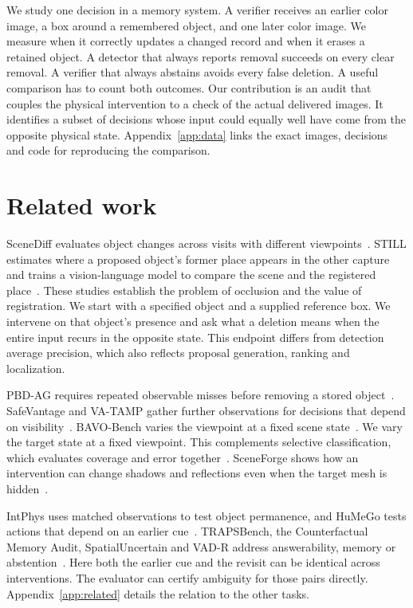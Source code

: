 \documentclass{article}
\begin{document}
We study one decision in a memory system. A verifier receives an earlier color image, a box around a remembered object, and one later color image.
We measure when it correctly updates a changed record and when it erases a retained object.
A detector that always reports removal succeeds on every clear removal. A verifier that always abstains avoids every false deletion. A useful comparison has to count both outcomes.
Our contribution is an audit that couples the physical intervention to a check of the actual delivered images. It identifies a subset of decisions whose input could equally well have come from the opposite physical state.
Appendix~\ref{app:data} links the exact images, decisions and code for reproducing the comparison.

\section{Related work}

SceneDiff evaluates object changes across visits with different viewpoints~\citep{scenediff}. STILL estimates where a proposed object's former place appears in the other capture and trains a vision-language model to compare the scene and the registered place~\citep{still}. These studies establish the problem of occlusion and the value of registration. We start with a specified object and a supplied reference box. We intervene on that object's presence and ask what a deletion means when the entire input recurs in the opposite state. This endpoint differs from detection average precision, which also reflects proposal generation, ranking and localization.

PBD-AG requires repeated observable misses before removing a stored object~\citep{pbdag}. SafeVantage and VA-TAMP gather further observations for decisions that depend on visibility~\citep{safevantage,vatamp}. BAVO-Bench varies the viewpoint at a fixed scene state~\citep{bavo}. We vary the target state at a fixed viewpoint. This complements selective classification, which evaluates coverage and error together~\citep{reject}. SceneForge shows how an intervention can change shadows and reflections even when the target mesh is hidden~\citep{sceneforge}.

IntPhys uses matched observations to test object permanence, and HuMeGo tests actions that depend on an earlier cue~\citep{intphys,humego}. TRAPSBench, the Counterfactual Memory Audit, SpatialUncertain and VAD-R address answerability, memory or abstention~\citep{trapsbench,cma,spatialuncertain,vad-r}. Here both the earlier cue and the revisit can be identical across interventions. The evaluator can certify ambiguity for those pairs directly. Appendix~\ref{app:related} details the relation to the other tasks.
\end{document}
